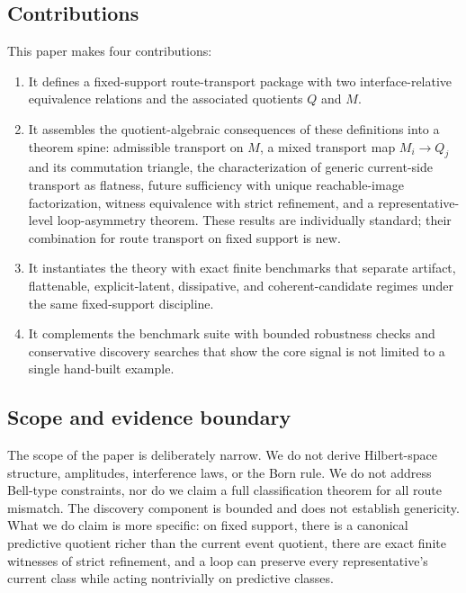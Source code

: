 \documentclass[11pt]{article}
\newcommand{\CurrentQ}{Q}
\newcommand{\PredictiveQ}{M}
\theoremstyle{definition}
\begin{document}
\subsection{Contributions}\label{subsec:intro-contributions}
This paper makes four contributions:
\begin{enumerate}
\item It defines a fixed-support route-transport package with two interface-relative equivalence relations and the associated quotients $\CurrentQ$ and $\PredictiveQ$.
\item It assembles the quotient-algebraic consequences of these definitions into a theorem spine: admissible transport on $\PredictiveQ$, a mixed transport map $\PredictiveQ_i\to\CurrentQ_j$ and its commutation triangle, the characterization of generic current-side transport as flatness, future sufficiency with unique reachable-image factorization, witness equivalence with strict refinement, and a representative-level loop-asymmetry theorem. These results are individually standard; their combination for route transport on fixed support is new.
\item It instantiates the theory with exact finite benchmarks that separate artifact, flattenable, explicit-latent, dissipative, and coherent-candidate regimes under the same fixed-support discipline.
\item It complements the benchmark suite with bounded robustness checks and conservative discovery searches that show the core signal is not limited to a single hand-built example.
\end{enumerate}

\subsection{Scope and evidence boundary}\label{subsec:intro-scope}
The scope of the paper is deliberately narrow. We do not derive Hilbert-space structure, amplitudes, interference laws, or the Born rule. We do not address Bell-type constraints, nor do we claim a full classification theorem for all route mismatch. The discovery component is bounded and does not establish genericity. What we do claim is more specific: on fixed support, there is a canonical predictive quotient richer than the current event quotient, there are exact finite witnesses of strict refinement, and a loop can preserve every representative's current class while acting nontrivially on predictive classes.
\end{document}
